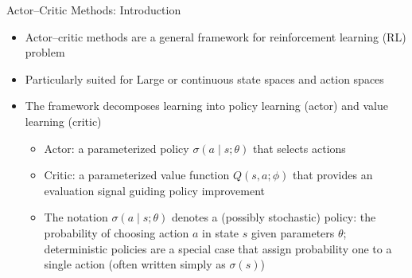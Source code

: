 \documentclass[aspectratio=169]{beamer}
\newcommand{\1}{\mathbf{1}}
\begin{document}
\begin{frame}{Actor--Critic Methods: Introduction}
  \begin{itemize}
      \item Actor--critic methods are a general framework for reinforcement learning (RL) problem
      \item Particularly suited for Large or continuous state spaces and action spaces
      \item The framework decomposes learning into policy learning (actor) and value learning (critic)
      \begin{itemize}
        \item Actor: a parameterized policy $\sigma(a \mid s; \theta)$ that selects actions
        \item Critic: a parameterized value function $Q(s,a; \phi)$ that provides an evaluation signal guiding policy improvement
        \item The notation $\sigma(a \mid s; \theta)$ denotes a (possibly stochastic) policy: the probability of choosing action $a$ in state $s$ given parameters $\theta$; deterministic policies are a special case that assign probability one to a single action (often written simply as $\sigma(s)$)
      \end{itemize}
  \end{itemize}
  \end{frame}
\end{document}
